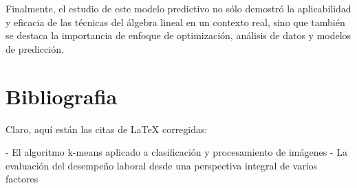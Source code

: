 \documentclass{plantillauft}
\begin{document}
Finalmente, el estudio de este modelo predictivo no sólo demostró la aplicabilidad y eficacia de las técnicas del álgebra lineal en un contexto real, sino que también se destaca la importancia de enfoque de optimización, análisis de datos y modelos de predicción.
\newpage


\section{Bibliografia}




Claro, aquí están las citas de LaTeX corregidas:


\cite{uno} - El algoritmo k-means aplicado a clasificación y procesamiento de imágenes
\cite{dos} - La evaluación del desempeño laboral desde una perspectiva integral de varios factores
\cite{tres}
\end{document}
